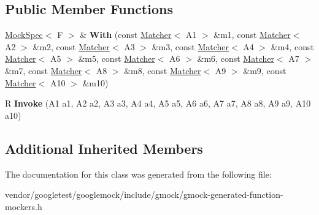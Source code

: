 \subsection*{Public Member Functions}
\begin{DoxyCompactItemize}
\item 
\mbox{\label{classtesting_1_1internal_1_1_function_mocker_3_01_r_07_a1_00_01_a2_00_01_a3_00_01_a4_00_01_a5_0038b5baf41d3183579372e0e15a9db969_a30238afadc5c348acff39f601fadc786}} 
\mbox{\hyperlink{classtesting_1_1internal_1_1_mock_spec}{Mock\+Spec}}$<$ F $>$ \& {\bfseries With} (const \mbox{\hyperlink{classtesting_1_1_matcher}{Matcher}}$<$ A1 $>$ \&m1, const \mbox{\hyperlink{classtesting_1_1_matcher}{Matcher}}$<$ A2 $>$ \&m2, const \mbox{\hyperlink{classtesting_1_1_matcher}{Matcher}}$<$ A3 $>$ \&m3, const \mbox{\hyperlink{classtesting_1_1_matcher}{Matcher}}$<$ A4 $>$ \&m4, const \mbox{\hyperlink{classtesting_1_1_matcher}{Matcher}}$<$ A5 $>$ \&m5, const \mbox{\hyperlink{classtesting_1_1_matcher}{Matcher}}$<$ A6 $>$ \&m6, const \mbox{\hyperlink{classtesting_1_1_matcher}{Matcher}}$<$ A7 $>$ \&m7, const \mbox{\hyperlink{classtesting_1_1_matcher}{Matcher}}$<$ A8 $>$ \&m8, const \mbox{\hyperlink{classtesting_1_1_matcher}{Matcher}}$<$ A9 $>$ \&m9, const \mbox{\hyperlink{classtesting_1_1_matcher}{Matcher}}$<$ A10 $>$ \&m10)
\item 
\mbox{\label{classtesting_1_1internal_1_1_function_mocker_3_01_r_07_a1_00_01_a2_00_01_a3_00_01_a4_00_01_a5_0038b5baf41d3183579372e0e15a9db969_a5ddc0163e96a8c644059f562dfa2cd4b}} 
R {\bfseries Invoke} (A1 a1, A2 a2, A3 a3, A4 a4, A5 a5, A6 a6, A7 a7, A8 a8, A9 a9, A10 a10)
\end{DoxyCompactItemize}
\subsection*{Additional Inherited Members}


The documentation for this class was generated from the following file\+:\begin{DoxyCompactItemize}
\item 
vendor/googletest/googlemock/include/gmock/gmock-\/generated-\/function-\/mockers.\+h\end{DoxyCompactItemize}

